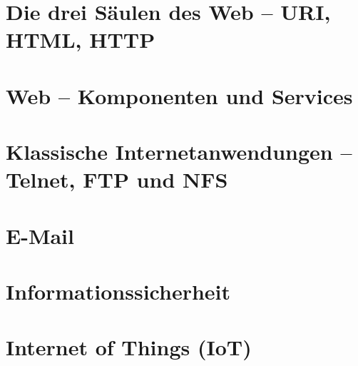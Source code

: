\documentclass[hidelinks]{article}
\begin{document}
\section{Die drei Säulen des Web -- URI, HTML, HTTP}

\section{Web -- Komponenten und Services}

\section{Klassische Internetanwendungen -- Telnet, FTP und NFS}

\section{E-Mail}

\section{Informationssicherheit}

\section{Internet of Things (IoT)}
\end{document}

